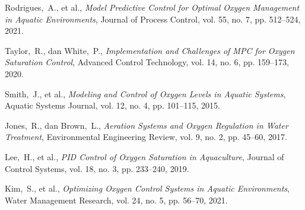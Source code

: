 Rodrigues,~A., et al., \emph{Model Predictive Control for Optimal Oxygen Management in Aquatic Environments}, Journal of Process Control, vol. 55, no. 7, pp. 512–524, 2021.

Taylor,~R., dan White,~P., \emph{Implementation and Challenges of MPC for Oxygen Saturation Control}, Advanced Control Technology, vol. 14, no. 6, pp. 159–173, 2020.

Smith,~J., et al., \emph{Modeling and Control of Oxygen Levels in Aquatic Systems}, Aquatic Systems Journal, vol. 12, no. 4, pp. 101–115, 2015.

Jones,~R., dan Brown,~L., \emph{Aeration Systems and Oxygen Regulation in Water Treatment}, Environmental Engineering Review, vol. 9, no. 2, pp. 45–60, 2017.

Lee,~H., et al., \emph{PID Control of Oxygen Saturation in Aquaculture}, Journal of Control Systems, vol. 18, no. 3, pp. 233–240, 2019.

Kim,~S., et al., \emph{Optimizing Oxygen Control Systems in Aquatic Environments}, Water Management Research, vol. 24, no. 5, pp. 56–70, 2021.